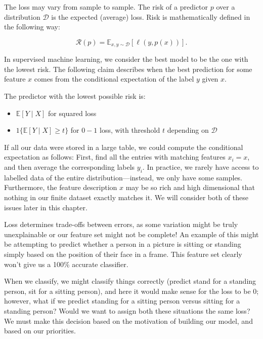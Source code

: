 



The loss may vary from sample to sample. The risk of a predictor $p$ over a distribution $\mathcal{D}$ is the expected (average) loss. Risk is mathematically defined in the following way:

$$\mathcal{R}(p)=\mathbb{E}_{x, y \sim \mathcal{D}}[\ell(y, p(x))].$$

In supervised machine learning, we consider the best model to be the one with the lowest risk.
The following claim describes when
the best prediction for some feature $x$ comes from the conditional expectation of the label $y$ given $x$.
\begin{claim}\label{claim:condition_exp}
    The predictor with the lowest possible risk is: 
    \begin{itemize}
        \item $\mathbb{E}[Y \mid X]$ for squared loss
        \item $1\{\mathbb{E}[Y \mid X] \geq t\}$ for $0-1$ loss, with threshold $t$ depending on $\mathcal{D}$
    \end{itemize}
\end{claim}
If all our data were stored in a large table, we could compute the conditional expectation as follows: First, find all the entries with matching features $x_i=x$, and then average the corresponding labels $y_i$.
In practice, we rarely have access to labelled data of the entire distribution---instead, we only have some samples. 
Furthermore, the feature description $x$ may be so rich and high dimensional that nothing in our finite dataset exactly matches it.
We will consider both of these issues later in this chapter.


Loss determines trade-offs between errors, as some variation might be truly unexplainable or our feature set might not be complete!  An example of this might be attempting to predict whether a person in a picture is sitting or standing simply based on the position of their face in a frame.  This feature set clearly won't give us a 100\% accurate classifier. 

When we classify, we might classify things correctly (predict stand for a standing person, sit for a sitting person), and here it would make sense for the loss to be 0; however, what if we predict standing for a sitting person versus sitting for a standing person?  Would we want to assign both these situations the same loss?  We must make this decision based on the motivation of building our model, and based on our priorities.  

